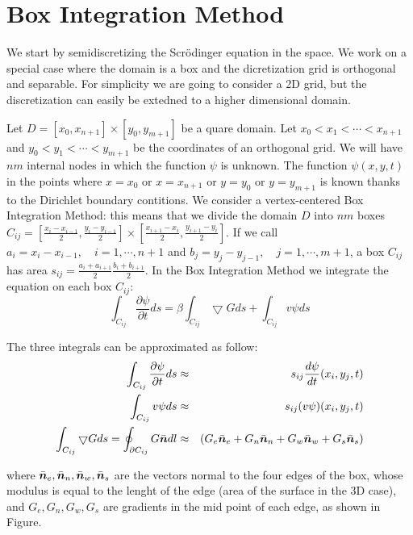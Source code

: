 \documentclass[a4paper,11pt]{article}
\newcommand{\ve}[1]{\mbox{\boldmath $ #1$}}
\begin{document}
\section{Box Integration Method}
We start by semidiscretizing the Scr\"{o}dinger equation in the space. We work on a special case where the domain is a box and the dicretization grid is orthogonal and separable. For simplicity we are going to consider a 2D grid, but the discretization can easily be extedned to a higher dimensional domain.

Let $D = [x_0, x_{n+1}] \times [y_0, y_{m+1}]$ be a quare domain.
Let $ x_0 < x_1 < \cdots < x_{n+1} $ and $ y_0 < y_1 < \cdots < y_{m+1} $ be the coordinates of an orthogonal grid. We will have $nm$ internal nodes in which the function $\psi$ is unknown. The function $\psi(x, y, t)$ in the points where $x = x_0$ or $x = x_{n+1}$ or $y = y_0$ or $y = y_{m+1}$ is known thanks to the Dirichlet boundary contitions.
We consider a vertex-centered Box Integration Method: this means that we divide the domain $D$ into $nm$ boxes $C_{ij} = [\frac{x_i - x_{i-1}}{2}, \frac{y_i - y_{i-1}}{2}] \times
                [\frac{x_{i+1} - x_i}{2}, \frac{y_{i+1} - y_i}{2}] $.
If we call $a_i = x_i - x_{i-1}, \quad i = 1, \cdots, n+1$ and
$b_j = y_j - y_{j-1}, \quad j = 1, \cdots, m+1$, a box $C_{ij}$ has area
$s_{ij} = \frac{a_i+a_{i+1}}{2} \frac{b_i+b_{i+1}}{2}$.
In the Box Integration Method we integrate the equation on each box $C_{ij}$:
$$ \int_{C_{ij}} \frac{\partial \psi}{\partial t} ds = 
   \beta \int_{C_{ij}} \bigtriangledown G ds + 
   \int_{C_{ij}} v \psi ds $$

The three integrals can be approximated as follow:
\begin{eqnarray}
\int_{C_{ij}} \frac{\partial \psi}{\partial t} ds & \approx &
   s_{ij} \frac{d \psi}{dt}(x_i, y_j, t) \\
\int_{C_{ij}} v \psi ds & \approx & s_{ij} (v \psi)(x_i, y_j, t) \\
\int_{C_{ij}} \bigtriangledown G ds = \oint_{\partial C_{ij}} G \bar{\ve{n}} dl & \approx &
   (G_e \bar{\ve n}_e + G_n \bar{\ve n}_n + G_w \bar{\ve n}_w + G_s \bar{\ve n}_s) \label{green_int}
\end{eqnarray}

where $\bar{\ve n}_e, \bar{\ve n}_n, \bar{\ve n}_w, \bar{\ve n}_s$ are the vectors normal to the four edges of the box, whose modulus is equal to the lenght of the edge (area of the surface in the 3D case), and $G_e, G_n, G_w, G_s$ are gradients in the mid point of each edge, as shown in Figure.
\end{document}
